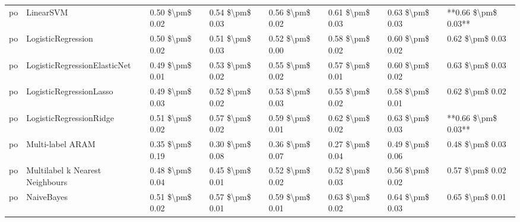 \begin{tabular}{llllllll}
      po &                       LinearSVM & 0.50 \$\textbackslash pm\$ 0.02 &           0.54 \$\textbackslash pm\$ 0.03 &       0.56 \$\textbackslash pm\$ 0.02 &        0.61 \$\textbackslash pm\$ 0.03 &                         0.63 \$\textbackslash pm\$ 0.03 & **0.66 \$\textbackslash pm\$ 0.03** \\
      po &              LogisticRegression & 0.50 \$\textbackslash pm\$ 0.02 &           0.51 \$\textbackslash pm\$ 0.03 &       0.52 \$\textbackslash pm\$ 0.00 &        0.58 \$\textbackslash pm\$ 0.02 &                         0.60 \$\textbackslash pm\$ 0.02 &     0.62 \$\textbackslash pm\$ 0.03 \\
      po &    LogisticRegressionElasticNet & 0.49 \$\textbackslash pm\$ 0.01 &           0.53 \$\textbackslash pm\$ 0.02 &       0.55 \$\textbackslash pm\$ 0.02 &        0.57 \$\textbackslash pm\$ 0.01 &                         0.60 \$\textbackslash pm\$ 0.02 &     0.63 \$\textbackslash pm\$ 0.03 \\
      po &         LogisticRegressionLasso & 0.49 \$\textbackslash pm\$ 0.03 &           0.52 \$\textbackslash pm\$ 0.02 &       0.53 \$\textbackslash pm\$ 0.03 &        0.55 \$\textbackslash pm\$ 0.02 &                         0.58 \$\textbackslash pm\$ 0.01 &     0.62 \$\textbackslash pm\$ 0.02 \\
      po &         LogisticRegressionRidge & 0.51 \$\textbackslash pm\$ 0.02 &           0.57 \$\textbackslash pm\$ 0.02 &       0.59 \$\textbackslash pm\$ 0.01 &        0.62 \$\textbackslash pm\$ 0.02 &                         0.63 \$\textbackslash pm\$ 0.03 & **0.66 \$\textbackslash pm\$ 0.03** \\
      po &                Multi-label ARAM & 0.35 \$\textbackslash pm\$ 0.19 &           0.30 \$\textbackslash pm\$ 0.08 &       0.36 \$\textbackslash pm\$ 0.07 &        0.27 \$\textbackslash pm\$ 0.04 &                         0.49 \$\textbackslash pm\$ 0.06 &     0.48 \$\textbackslash pm\$ 0.03 \\
      po & Multilabel k Nearest Neighbours & 0.48 \$\textbackslash pm\$ 0.04 &           0.45 \$\textbackslash pm\$ 0.01 &       0.52 \$\textbackslash pm\$ 0.02 &        0.52 \$\textbackslash pm\$ 0.03 &                         0.56 \$\textbackslash pm\$ 0.02 &     0.57 \$\textbackslash pm\$ 0.02 \\
      po &                      NaiveBayes & 0.51 \$\textbackslash pm\$ 0.02 &           0.57 \$\textbackslash pm\$ 0.01 &       0.59 \$\textbackslash pm\$ 0.01 &        0.63 \$\textbackslash pm\$ 0.02 &                         0.64 \$\textbackslash pm\$ 0.03 &     0.65 \$\textbackslash pm\$ 0.01 \\

\end{tabular}
